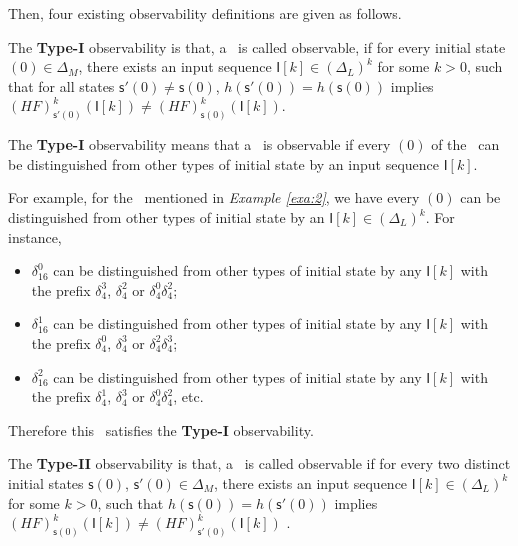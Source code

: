 Then, four existing observability definitions are given as follows.

\begin{definition} 
The {\bf Type-I} observability is that, a \BCN\ is called observable, if for every initial state \State$(0)$$\in \Delta_M$, there exists an input sequence $\mathsf{I}[k]\in(\Delta_L)^k$ for some $k>0$, such that for all states $\mathsf{s}'(0)\neq \mathsf{s}(0)$, $h(\mathsf{s}'(0))=h(\mathsf{s}(0))$ implies $(HF)^k_{\mathsf{s}'(0)}(\mathsf{I}[k])\neq (HF)^k_{{\mathsf{s}(0)}}(\mathsf{I}[k])$\cite{cheng2009controllability}.
\end{definition}

The  {\bf Type-I} observability means that a \BCN\ is observable if every \State$(0)$ of the \BCN\ can be distinguished from other types of initial state by an input sequence $\mathsf{I}[k]$. %
\begin{example}
For example, for the \BCN\ mentioned in {\em Example \ref{exa:2}}, we have every \State$(0)$ can be distinguished from other types of initial state by an $\mathsf{I}[k] \in(\Delta_L)^k$.  For instance,
\begin{itemize}
  \item $\delta_{16}^0$ can be distinguished from other types of initial state by any $\mathsf{I}[k]$ with the prefix $\delta_{4}^3$, $\delta_{4}^2$ or $\delta_{4}^0  \delta_{4}^2$;%
  \item $\delta_{16}^1$ can be distinguished from other types of initial state by any $\mathsf{I}[k]$ with the prefix $\delta_{4}^0$, $\delta_{4}^3$ or $\delta_{4}^2 \delta_{4}^3$;
  \item $\delta_{16}^2$ can be distinguished from other types of initial state by any $\mathsf{I}[k]$ with the prefix $\delta_{4}^1$, $\delta_{4}^3$ or $\delta_{4}^0 \delta_{4}^2$, etc.
\end{itemize} 
Therefore this \BCN\ satisfies the  {\bf Type-I} observability.
\label{exa:4}
\end{example}   

\begin{definition}
	The  {\bf Type-II} observability is that, a \BCN\ is called observable if for every two distinct initial states $\mathsf{s}(0)$, $\mathsf{s}'(0) \in \Delta_M$, there exists an input sequence $\mathsf{I}[k]\in(\Delta_L)^k$ for some $k>0$, such that $h(\mathsf{s}(0))=h(\mathsf{s}'(0))$ implies $(HF)^k_{\mathsf{s}(0)}(\mathsf{I}[k])\neq (HF)^k_{\mathsf{s}'(0)}(\mathsf{I}[k])$ \cite{Zhao2010Input}.
\end{definition}

